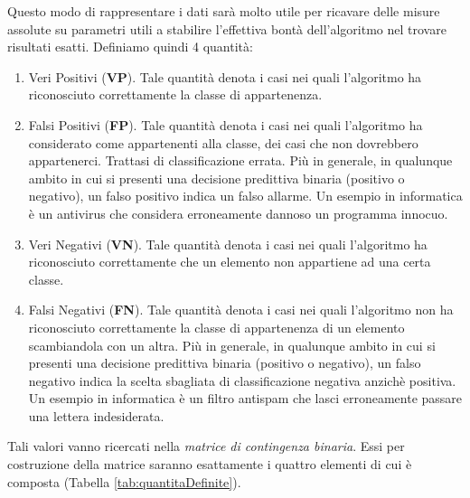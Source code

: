 Questo modo di rappresentare i dati sarà molto utile per ricavare delle misure assolute su parametri utili a stabilire l'effettiva bontà dell'algoritmo nel trovare risultati esatti. Definiamo quindi 4 quantità:
\begin{enumerate}
	\item Veri Positivi (\textbf{VP}). Tale quantità denota i casi nei quali l’algoritmo ha riconosciuto correttamente la classe di appartenenza.
	\item Falsi Positivi (\textbf{FP}). Tale quantità denota i casi nei quali l’algoritmo ha considerato come appartenenti alla classe, dei casi che non dovrebbero appartenerci. Trattasi di classificazione errata. Più in generale, in qualunque ambito in cui si presenti una decisione predittiva binaria (positivo o negativo), un falso positivo indica un falso allarme. Un esempio in informatica è un antivirus che considera erroneamente dannoso un programma innocuo.
	\item Veri Negativi (\textbf{VN}). Tale quantità denota i casi nei quali l'algoritmo ha riconosciuto correttamente che un elemento non appartiene ad una certa classe.
	\item Falsi Negativi (\textbf{FN}). Tale quantità denota i casi nei quali l’algoritmo non ha riconosciuto correttamente la classe di appartenenza di un elemento scambiandola con un altra. Più in generale, in qualunque ambito in cui si presenti una decisione predittiva binaria (positivo o negativo), un falso negativo indica la scelta sbagliata di classificazione negativa anzichè positiva. Un esempio in informatica è un filtro antispam che lasci erroneamente passare una lettera indesiderata.
\end{enumerate}
Tali valori vanno ricercati nella \textit{matrice di contingenza binaria}. Essi per costruzione della matrice saranno esattamente i quattro elementi di cui è composta (Tabella \ref{tab:quantitaDefinite}). 

